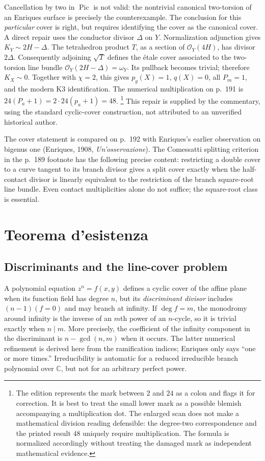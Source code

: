 Cancellation by two in \(\operatorname{Pic}\) is not valid: the nontrivial canonical two-torsion of an Enriques surface is precisely the counterexample. The conclusion for this \emph{particular} cover is right, but requires identifying the cover as the canonical cover. A direct repair uses the conductor divisor \(\Delta\) on \(Y\). Normalization adjunction gives \(K_Y\sim2H-\Delta\). The tetrahedron product \(T\), as a section of \(\mathcal O_Y(4H)\), has divisor \(2\Delta\). Consequently adjoining \(\sqrt T\) defines the étale cover associated to the two-torsion line bundle \(\mathcal O_Y(2H-\Delta)=\omega_Y\). Its pullback becomes trivial; therefore \(K_X\sim0\). Together with \(\chi=2\), this gives \(p_g(X)=1\), \(q(X)=0\), all \(P_m=1\), and the modern K3 identification. The numerical multiplication on p.~191 is \(24(P_a+1)=2\cdot24(p_a+1)=48\). \footnote{The edition represents the mark between $2$ and
$24$ as a colon and flags it for correction. It is best to treat the
small lower mark as a possible blemish accompanying a multiplication dot.
The enlarged scan does not make a mathematical division reading defensible:
the degree-two correspondence and the printed result $48$ uniquely require
multiplication. The formula is normalized accordingly without treating the
damaged mark as independent mathematical evidence.} This repair is supplied by the commentary, using the standard cyclic-cover construction, not attributed to an unverified historical author.

The cover statement is compared on p.~192 with Enriques's earlier observation on bigenus one (Enriques, 1908, \emph{Un'osservazione}). The Comessatti splitting criterion in the p.~189 footnote has the following precise content: restricting a double cover to a curve tangent to its branch divisor gives a split cover exactly when the half-contact divisor is linearly equivalent to the restriction of the branch square-root line bundle. Even contact multiplicities alone do not suffice; the square-root class is essential.

\section{Teorema d'esistenza}
\label{cp1-v-9}

\subsection{Discriminants and the line-cover problem}

A polynomial equation \(z^n=f(x,y)\) defines a cyclic cover of the affine plane when its function field has degree \(n\), but its \emph{discriminant divisor} includes \((n-1)(f=0)\) and may branch at infinity. If \(\deg f=m\), the monodromy around infinity is the inverse of an \(m\)th power of an \(n\)-cycle, so it is trivial exactly when \(n\mid m\). More precisely, the coefficient of the infinity component in the discriminant is \(n-\gcd(n,m)\) when it occurs. The latter numerical refinement is derived here from the ramification indices; Enriques only says ``one or more times.'' Irreducibility is automatic for a reduced irreducible branch polynomial over \(\mathbb C\), but not for an arbitrary perfect power.

